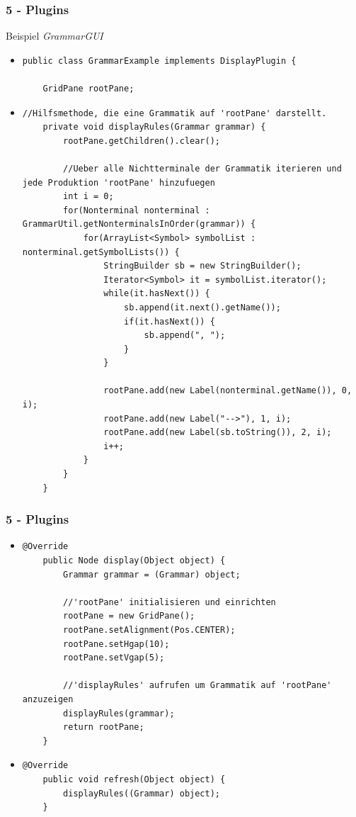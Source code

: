 \documentclass[9pt, xcolor={dvipsnames}]{beamer}
\begin{document}
\begin{frame}[fragile]\frametitle{5 - Plugins}
	{ \fontsize{12}{12} \selectfont Beispiel \textit{GrammarGUI}}
	\begin{itemize}
		\pause
		\item[]
		\begin{lstlisting}[frame=single, basicstyle=\tiny]
public class GrammarExample implements DisplayPlugin {

	GridPane rootPane;
		\end{lstlisting}
		\pause
		\item[]
		\begin{lstlisting}[frame=single, basicstyle=\tiny]
	//Hilfsmethode, die eine Grammatik auf 'rootPane' darstellt.
	private void displayRules(Grammar grammar) {
		rootPane.getChildren().clear();
		
		//Ueber alle Nichtterminale der Grammatik iterieren und jede Produktion 'rootPane' hinzufuegen
		int i = 0;
		for(Nonterminal nonterminal : GrammarUtil.getNonterminalsInOrder(grammar)) {
			for(ArrayList<Symbol> symbolList : nonterminal.getSymbolLists()) {
				StringBuilder sb = new StringBuilder();
				Iterator<Symbol> it = symbolList.iterator();
				while(it.hasNext()) {
					sb.append(it.next().getName());
					if(it.hasNext()) {
						sb.append(", ");
					}
				}
			
				rootPane.add(new Label(nonterminal.getName()), 0, i);
				rootPane.add(new Label("-->"), 1, i);
				rootPane.add(new Label(sb.toString()), 2, i);
				i++;
			}
		}
	}
		\end{lstlisting}
	\end{itemize}
\end{frame}

\begin{frame}[fragile]\frametitle{5 - Plugins}
	\begin{itemize}
		\item[]
		\begin{lstlisting}[frame=single, basicstyle=\tiny]
	@Override
	public Node display(Object object) {
		Grammar grammar = (Grammar) object;
		
		//'rootPane' initialisieren und einrichten
		rootPane = new GridPane();
		rootPane.setAlignment(Pos.CENTER);
		rootPane.setHgap(10);
		rootPane.setVgap(5);
		
		//'displayRules' aufrufen um Grammatik auf 'rootPane' anzuzeigen
		displayRules(grammar);
		return rootPane;
	}
		\end{lstlisting}
		\pause
		\item[]
		\begin{lstlisting}[frame=single, basicstyle=\tiny]
	@Override
	public void refresh(Object object) {
		displayRules((Grammar) object);
	}
		\end{lstlisting}
	\end{itemize}
\end{frame}
\end{document}
